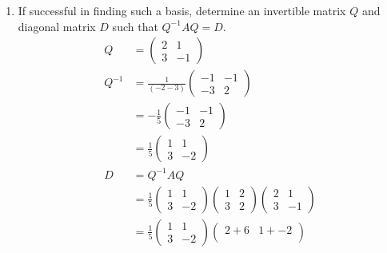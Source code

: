 \documentclass[13pt]{article}
\begin{document}
\begin{enumerate}[label=(\alph*),leftmargin=*]
\begin{enumerate}[label=(\roman*),leftmargin=*]
    \item If successful in finding such a basis, determine an invertible matrix $Q$ and diagonal matrix $D$ such that $Q^{-1}AQ = D$. \\
      \begin{align*}
        Q &=
            \begin{pmatrix}
              2 & 1 \\
              3 & -1
            \end{pmatrix} \\
        Q^{-1} &= \frac{1}{(-2 - 3)}
                 \begin{pmatrix}
                   -1 & -1 \\
                   -3 & 2
                 \end{pmatrix} \\
          &= -\frac{1}{5}
            \begin{pmatrix}
              -1 & -1 \\
              -3 & 2
            \end{pmatrix} \\
          &= \frac{1}{5}
            \begin{pmatrix}
              1 & 1 \\
              3 & -2
            \end{pmatrix} \\
        D &= Q^{-1}AQ \\
          &= \frac{1}{5}
            \begin{pmatrix}
              1 & 1 \\
              3 & -2
            \end{pmatrix}
            \begin{pmatrix}
              1 & 2 \\
              3 & 2
            \end{pmatrix}
            \begin{pmatrix}
              2 & 1 \\
              3 & -1
            \end{pmatrix} \\
          &= \frac{1}{5}
            \begin{pmatrix}
              1 & 1 \\
              3 & -2
            \end{pmatrix}
            \begin{pmatrix}
              2 + 6 & 1 + -2 \\

\end{pmatrix}
\end{align*}
\end{enumerate}
\end{enumerate}
\end{document}
